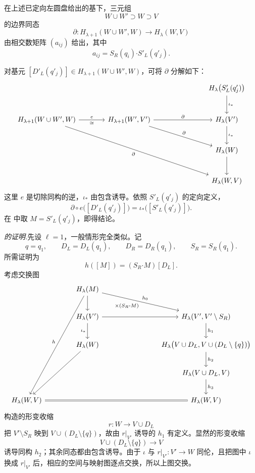 在上述已定向左圆盘给出的基下，三元组
\[
  W\cup W'\supset W\supset V
\]
的边界同态
\[
  \partial:H_{\lambda+1}(W\cup W',W)
  \longrightarrow H_\lambda(W,V)
\]
由相交数矩阵 $(a_{ij})$ 给出，其中
\[
  a_{ij}=S_R(q_i)\mathbin{\boldsymbol\cdot}S'_L(q'_j).
\]

\Proof 对基元 $[D'_L(q'_j)]\in H_{\lambda+1}(W\cup W',W)$，可将 $\partial$ 分解如下：
\[
\begin{tikzcd}[column sep=3.7em,row sep=2.6em]
  &&& H_\lambda\bigl(S'_L(q'_j)\bigr) \arrow[d,"\iota_*"] \\
  H_{\lambda+1}(W\cup W',W)
    \arrow[r,"e","\cong"']
    \arrow[rrrdd,"\partial"']
  & H_{\lambda+1}(W',V')
    \arrow[rr,"\partial"]
    \arrow[rrd,"\partial"]
  && H_\lambda(V') \arrow[d,"\iota_*"] \\
  &&& H_\lambda(W) \arrow[d] \\
  &&& H_\lambda(W,V)
\end{tikzcd}
\]
这里 $e$ 是切除同构的逆，$\iota_*$ 由包含诱导。依照 $S'_L(q'_j)$ 的定向定义，
\[
  \partial\circ e\bigl([D'_L(q'_j)]\bigr)
  =\iota_*\bigl([S'_L(q'_j)]\bigr).
\]
在 中取 $M=S'_L(q'_j)$，即得结论。
\EndProof

\par\medskip\noindent\textit{ 的证明.}\quad 先设 $\ell=1$，一般情形完全类似。记
\[
  q=q_1,\qquad D_L=D_L(q_1),\qquad
  D_R=D_R(q_1),\qquad S_R=S_R(q_1).
\]
所需证明为
\[
  h([M])=(S_R\mathbin{\boldsymbol\cdot}M)[D_L].
\]
考虑交换图
\[
\begin{tikzcd}[column sep=4.0em,row sep=2.15em]
  & H_\lambda(M)
      \arrow[d]
      \arrow[rrd,"h_0","{\times(S_R\mathbin{\boldsymbol\cdot}M)}"']
      \arrow[ldddd,"h"']
  && {} \\
  {} & H_\lambda(V') \arrow[d,"\iota_*"'] \arrow[rr]
  && H_\lambda(V',V'\setminus S_R) \arrow[d,"h_1"] \\
  {} & H_\lambda(W) \arrow[ldd]
  && H_\lambda\bigl(V\cup D_L,V\cup(D_L\setminus\{q\})\bigr)
      \arrow[d,"h_2"] \\
  {} & {} && H_\lambda(V\cup D_L,V) \arrow[d,"h_3"] \\
  H_\lambda(W,V)
  &&& H_\lambda(W,V) \arrow[lll,equal]
\end{tikzcd}
\]
 构造的形变收缩
\[
  r:W\longrightarrow V\cup D_L
\]
把 $V'\setminus S_R$ 映到 $V\cup(D_L\setminus\{q\})$，故由 $r|_{V'}$ 诱导的 $h_1$ 有定义。显然的形变收缩
\[
  V\cup(D_L\setminus\{q\})\longrightarrow V
\]
诱导同构 $h_2$；其余同态都由包含诱导。由于 $\iota$ 与 $r|_{V'}:V'\to W$ 同伦，且把图中 $\iota$ 换成 $r|_{V'}$ 后，相应的空间与映射图逐点交换，所以上图交换。

